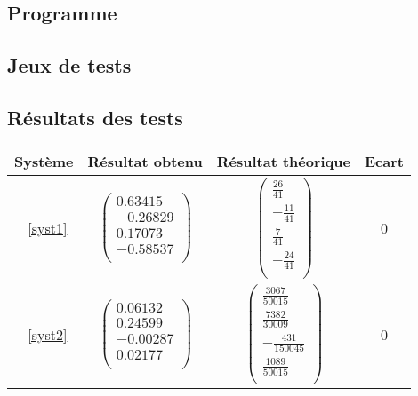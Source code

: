 \documentclass{report}
\begin{document}
      \subsection{Programme}
        
      \newpage
      \subsection{Jeux de tests}
        \renewcommand{\arraystretch}{2}
      \subsection{Résultats des tests}
        \begin{tabular}{|c|c|c|c|}
           \hline
           Système & Résultat obtenu & Résultat théorique & Ecart \\ %
           \hline
           ~\eqref{syst1} 
           & 
           $\begin{pmatrix}
				0.63415 \\
				-0.26829	\\
				0.17073	\\
				-0.58537 \\
			     \end{pmatrix}$          
		   & $\begin{pmatrix}
				\frac{26}{41} \\
				-\frac{11}{41} \\
				\frac{7}{41} \\
				-\frac{24}{41} \\
			     \end{pmatrix}$          
		   & 0 \\
	    \hline
           ~\eqref{syst2} 
           & $\begin{pmatrix}
				0.06132 \\	
				0.24599	\\
				-0.00287	\\
				0.02177 \\
			     \end{pmatrix}$          
		   & $\begin{pmatrix}
				\frac{3067}{50015} \\
				\frac{7382}{30009} \\
				-\frac{431}{150045} \\
				\frac{1089}{50015} \\
			     \end{pmatrix}$          
		   & 0 \\

\end{tabular}
\end{document}
